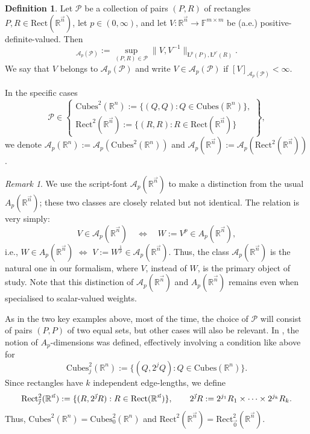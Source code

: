 \documentclass[11pt, reqno]{amsart}
\theoremstyle{definition}
\newtheorem{definition}[theorem]{Definition}
\theoremstyle{remark}
\newtheorem{remark}[theorem]{Remark}
\numberwithin{equation}{section}
\newcommand{\A}{\mathscr A}
\newcommand{\F}{\mathbb F}
\newcommand{\Pc}{\mathscr P}
\newcommand{\R}{\mathbb R}
\newcommand{\vnull}{\vec 0}
\newcommand{\vj}{\vec{\textit{\j}}}
\newcommand{\vn}{\vec n}
\newcommand{\aveL}{\textit{\L}}
\newcommand{\Cubes}{\mathrm{Cubes}}
\newcommand{\Rect}{\mathrm{Rect}}
\begin{document}
\begin{definition}\label{def Ap}
Let $\Pc$ be a collection of pairs $(P,R)$ of rectangles $P,R\in\Rect(\R^{\vn})$, let $p\in(0,\infty)$, and let $V:\R^{\vn}\to\F^{m\times m}$ be (a.e.) positive-definite-valued. Then
\begin{equation*}
[V]_{\A_{p}(\Pc)}:=\sup_{(P,R)\in\Pc}\|V,V^{-1}\|_{\aveL^{p}(P),\aveL^{p'}(R)}.
\end{equation*}
We say that $V$ belongs to $\A_{p}(\Pc)$ and write $V\in\A_{p}(\Pc)$ if $[V]_{\A_{p}(\Pc)}<\infty$.

In the specific cases
\begin{equation*}
  \Pc\in\left.\begin{cases} \Cubes^2(\R^n) :=\{(Q,Q):Q\in\Cubes(\R^n)\}, \\
    \Rect^2(\R^{\vn}) :=\{(R,R):R\in\Rect(\R^{\vn})\}\end{cases}\right\},
\end{equation*}
we denote $\A_p(\R^n):=\A_p(\Cubes^2(\R^n))$ and $\A_p(\R^{\vn}):=\A_p(\Rect^2(\R^{\vn}))$.
\end{definition}

\begin{remark}\label{rem Ap}
We use the script-font $\A_p(\R^{\vn})$ to make a distinction from the usual $A_p(\R^{\vn})$; these two classes are closely related but not identical. The relation is very simply:
\begin{equation*}
  V\in\A_p(\R^{\vn})\quad\Longleftrightarrow\quad W:=V^p\in A_p(\R^{\vn}),
\end{equation*}
i.e., $W\in A_p(\R^{\vn})$ $\Longleftrightarrow$ $V:=W^{\frac1p}\in \A_p(\R^{\vn})$. Thus, the class $\A_p(\R^{\vn})$ is the natural one in our formalism, where $V$, instead of $W$, is the primary object of study. Note that this distinction of $\A_p(\R^{\vn})$ and $A_p(\R^{\vn})$ remains even when specialised to scalar-valued weights.
\end{remark}

As in the two key examples above, most of the time, the choice of $\Pc$ will consist of pairs $(P,P)$ of two equal sets, but other cases will also be relevant. In \cite{BHYY:1a}, the notion of $A_p$-dimensions was defined, effectively involving a condition like above for
\begin{equation*}
\Cubes^2_j(\R^n):=\{(Q,2^j Q):Q\in\Cubes(\R^n)\}.
\end{equation*}
Since rectangles have $k$ independent edge-lengths, we define
\begin{equation*}
\Rect^2_{\vj}(\R^{\vn}):=\{(R,2^{\vj}R):R\in\Rect(\R^{\vn})\},\qquad
2^{\vj}R:=2^{j_1}R_1\times\cdots\times 2^{j_k}R_k.
\end{equation*}
Thus, $\Cubes^2(\R^n)=\Cubes^2_0(\R^n)$ and $\Rect^2(\R^{\vn})=\Rect^2_{\vnull}(\R^{\vn})$.
\end{document}
